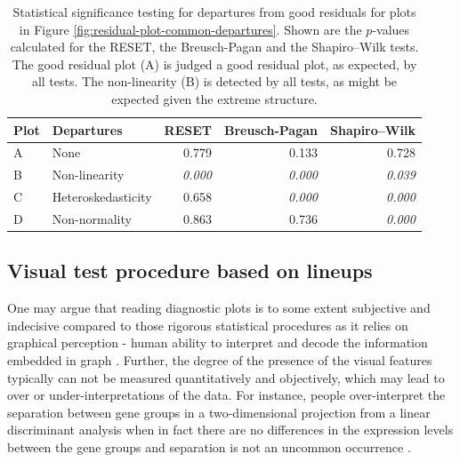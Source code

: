 \documentclass[]{interact}
\theoremstyle{plain}%
\theoremstyle{definition}
\theoremstyle{remark}
\begin{document}
\begin{table}

\caption{\label{tab:example-residual-plot-table}Statistical significance testing for departures from good residuals for plots in Figure \ref{fig:residual-plot-common-departures}. Shown are the $p$-values calculated for the RESET, the Breusch-Pagan and the Shapiro–Wilk tests. The good residual plot (A) is judged a good residual plot, as expected, by all tests. The non-linearity (B) is detected by all tests, as might be expected given the extreme structure.}
\centering
\begin{tabular}[t]{llrrr}
\toprule
Plot & Departures & RESET & Breusch-Pagan & Shapiro–Wilk\\
\midrule
A & None & 0.779 & 0.133 & 0.728\\
B & Non-linearity & \em{0.000} & \em{0.000} & \em{0.039}\\
C & Heteroskedasticity & 0.658 & \em{0.000} & \em{0.000}\\
D & Non-normality & 0.863 & 0.736 & \em{0.000}\\
\bottomrule
\end{tabular}
\end{table}

\hypertarget{visual-test-procedure-based-on-lineups}{%
\subsection{Visual test procedure based on
lineups}\label{visual-test-procedure-based-on-lineups}}

One may argue that reading diagnostic plots is to some extent subjective
and indecisive compared to those rigorous statistical procedures as it
relies on graphical perception - human ability to interpret and decode
the information embedded in graph \citep{cleveland_graphical_1984}.
Further, the degree of the presence of the visual features typically can
not be measured quantitatively and objectively, which may lead to over
or under-interpretations of the data. For instance, people
over-interpret the separation between gene groups in a two-dimensional
projection from a linear discriminant analysis when in fact there are no
differences in the expression levels between the gene groups and
separation is not an uncommon occurrence
\citep{roy_chowdhury_using_2015}.
\end{document}
